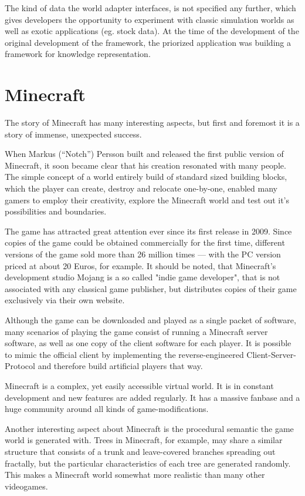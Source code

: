 The kind of data the world adapter interfaces, is not specified any further, which gives developers the opportunity to experiment with classic simulation worlds as well as exotic applications (eg. stock data). At the time of the development of the original development of the framework, the priorized application was building a framework for knowledge representation.~\cite{conf/agi/Bach12}

    \section{Minecraft}
The story of Minecraft has many interesting aspects, but first and foremost it is a story of immense, unexpected success.

When Markus (``Notch'') Persson built and released the first public version of Minecraft, it soon became clear that his creation resonated with many people. The simple concept of a world entirely build of standard sized building blocks, which the player can create, destroy and relocate one-by-one, enabled many gamers to employ their creativity, explore the Minecraft world and test out it's possibilities and boundaries.

The game has attracted great attention ever since its first release in 2009. Since copies of the game could be obtained commercially for the first time, different versions of the game sold more than 26 million times --- with the PC version priced at about 20 Euros, for example. It should be noted, that Minecraft's development studio Mojang is a so called "indie game developer", that is not associated with any classical game publisher, but distributes copies of their game exclusively via their own website.

Although the game can be downloaded and played as a single packet of software, many scenarios of playing the game consist of running a Minecraft server software, as well as one copy of the client software for each player. It is possible to mimic the official client by implementing the reverse-engineered Client-Server-Protocol and therefore build artificial players that way.

Minecraft is a complex, yet easily accessible virtual world. It is in constant development and new features are added regularly. It has a massive fanbase and a huge community around all kinds of game-modifications.

Another interesting aspect about Minecraft is the procedural semantic the game world is generated with. Trees in Minecraft, for example, may share a similar structure that consists of a trunk and leave-covered branches spreading out fractally, but the particular characteristics of each tree are generated randomly. This makes a Minecraft world somewhat more realistic than many other videogames.

